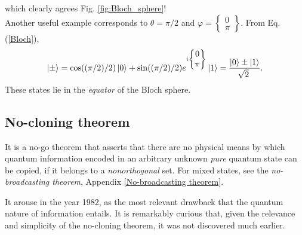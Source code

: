 \documentclass[11pt]{article}
\numberwithin{equation}{section} %
\numberwithin{figure}{section} %
\begin{document}
\begin{appendices}
which clearly agrees Fig. \ref{fig:Bloch_sphere}!\\

Another useful example corresponds to $\theta=\pi/2$ and $\varphi=\begin{Bmatrix}0\\\pi\end{Bmatrix}$. From Eq. (\ref{Bloch}),
\begin{equation} 
\ket{\pm}=\cos((\pi/2)/2)\ket{0}+\sin((\pi/2)/2)e^{i\begin{Bmatrix}0\\\pi\end{Bmatrix}}\ket{1}=\frac{\ket{0}\pm\ket{1}}{\sqrt[]{2}}\textrm{.}
\end{equation}
These states lie in the \emph{equator} of the Bloch sphere.





\subsection{No-cloning theorem} \label{No-cloning theorem}

	It is a no-go theorem that asserts that there are no physical means by which quantum information encoded in an arbitrary unknown \emph{pure} quantum state can be copied, if it belongs to a \emph{nonorthogonal} set. For mixed states, see the \emph{no-broadcasting theorem}, Appendix \ref{No-broadcasting theorem}.%
	
It arouse in the year 1982, as the most relevant drawback that the quantum nature of information entails. It is remarkably curious that, given the relevance and simplicity of the no-cloning theorem, it was not discovered much earlier. %



\end{appendices}
\end{document}
